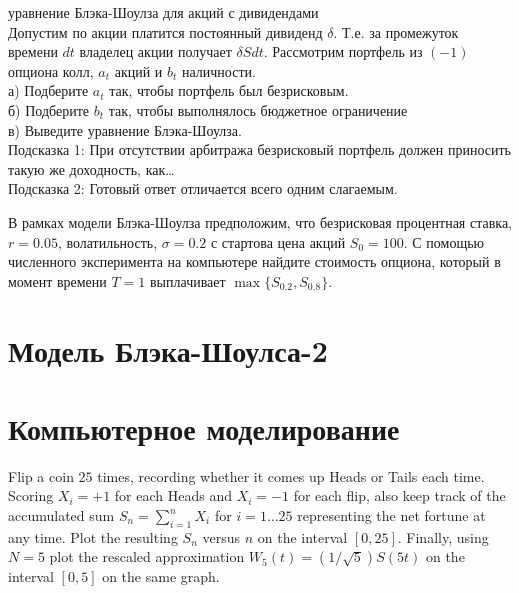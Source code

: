 \begin{problem}
 уравнение Блэка-Шоулза для акций с дивидендами \\
Допустим по акции платится постоянный дивиденд $\delta$. Т.е. за промежуток времени $dt$ владелец акции получает $\delta Sdt$. Рассмотрим портфель из $(-1)$ опциона колл, $a_{t}$ акций и $b_{t}$ наличности. \\
а) Подберите $a_{t}$ так, чтобы портфель был безрисковым. \\
б) Подберите $b_{t}$ так, чтобы выполнялось бюджетное ограничение \\
в) Выведите уравнение Блэка-Шоулза. \\
Подсказка 1: При отсутствии арбитража безрисковый портфель должен приносить такую же доходность, как\ldots \\
Подсказка 2: Готовый ответ отличается всего одним слагаемым. 
\end{problem} 
\begin{solution} 

\end{solution}

\begin{problem}
В рамках модели Блэка-Шоулза предположим, что безрисковая процентная ставка, $r=0.05$, волатильность, $\sigma=0.2$ с стартова цена акций $S_0=100$. С помощью численного эксперимента на компьютере найдите стоимость опциона, который в момент времени $T=1$ выплачивает $\max\{ S_{0.2},S_{0.8}\}$. 
\end{problem} 
\begin{solution} 
\end{solution}


\section{Модель Блэка-Шоулса-2}


\section{Компьютерное моделирование} 

\begin{problem}
  Flip a coin $25$ times, recording whether it comes up Heads  or Tails each time.  Scoring $X_i = +1$ for each Heads and $X_i = -1$ for each flip, also keep track of the accumulated sum $S_n = \sum_{i=1}^n X_i$ for $i = 1 \dots 25$ representing the net fortune at any time.  Plot the resulting $S_n$ versus $n$ on the interval   $[0,25]$.  Finally, using $N=5$ plot the rescaled approximation  $W_5(t) = (1/\sqrt{5}) S(5t)$ on the interval $[0,5]$ on the same graph. 
\end{problem} 
\begin{solution} 
\end{solution}



